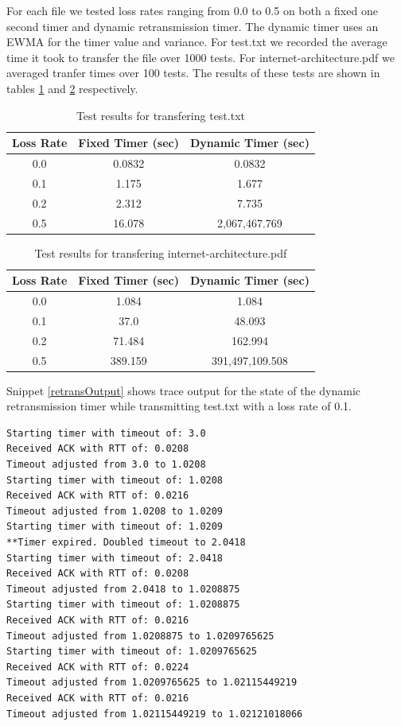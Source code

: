 \documentclass[11pt]{article}
\begin{document}
For each file we tested loss rates ranging from 0.0 to 0.5 on both a fixed one second timer and dynamic retransmission timer. The dynamic timer uses an EWMA for the timer value and variance. For test.txt we recorded the average time it took to transfer the file over 1000 tests. For internet-architecture.pdf we averaged tranfer times over 100 tests. The results of these tests are shown in tables \ref{tbltest} and \ref{tblinternet} respectively.

\begin{table}[H]
\begin{center}
\caption{Test results for transfering test.txt}
\label{tbltest}
\begin{tabular}{ccc}
  \toprule
  Loss Rate & Fixed Timer (sec) & Dynamic Timer (sec) \\
  \midrule
  0.0 & 0.0832 & 0.0832 \\
  0.1 & 1.175 & 1.677 \\
  0.2 & 2.312 & 7.735 \\
  0.5 & 16.078 & 2,067,467.769 \\
  \bottomrule
\end{tabular}
\end{center}
\end{table}

\begin{table}[H]
\begin{center}
\caption{Test results for transfering internet-architecture.pdf}
\label{tblinternet}
\begin{tabular}{ccc}
  \toprule
  Loss Rate & Fixed Timer (sec) & Dynamic Timer (sec) \\
  \midrule
  0.0 & 1.084 & 1.084 \\
  0.1 & 37.0 & 48.093 \\
  0.2 & 71.484 & 162.994 \\
  0.5 & 389.159 & 391,497,109.508 \\
  \bottomrule
\end{tabular}
\end{center}
\end{table}

Snippet \ref{retransOutput} shows trace output for the state of the dynamic retransmission timer while transmitting test.txt with a loss rate of 0.1.

\begin{lstlisting}[caption={Dynamic retransmission output},label=retransOutput]
Starting timer with timeout of: 3.0
Received ACK with RTT of: 0.0208
Timeout adjusted from 3.0 to 1.0208
Starting timer with timeout of: 1.0208
Received ACK with RTT of: 0.0216
Timeout adjusted from 1.0208 to 1.0209
Starting timer with timeout of: 1.0209
**Timer expired. Doubled timeout to 2.0418
Starting timer with timeout of: 2.0418
Received ACK with RTT of: 0.0208
Timeout adjusted from 2.0418 to 1.0208875
Starting timer with timeout of: 1.0208875
Received ACK with RTT of: 0.0216
Timeout adjusted from 1.0208875 to 1.0209765625
Starting timer with timeout of: 1.0209765625
Received ACK with RTT of: 0.0224
Timeout adjusted from 1.0209765625 to 1.02115449219
Received ACK with RTT of: 0.0216
Timeout adjusted from 1.02115449219 to 1.02121018066
\end{lstlisting}
\end{document}
